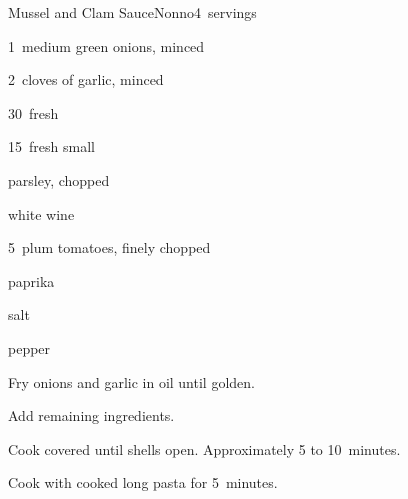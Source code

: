 \begin{recipe}{Mussel and Clam Sauce}{Nonno}{4~servings}

\begin{ingredients}
\item 1~medium green onions, minced
\item 2~cloves of garlic, minced
\item 30~fresh 
\item 15~fresh small 
\item \C{\half} parsley, chopped
\item {} white wine
\item 5~plum tomatoes, finely chopped
\item paprika
\item salt
\item pepper
\end{ingredients}

\begin{directions}
\item Fry onions and garlic in oil until golden.
\item Add remaining ingredients.
\item Cook covered until shells open. Approximately 5 to 10~minutes.
\item Cook with cooked long pasta for 5~minutes.
\end{directions}

\end{recipe}
